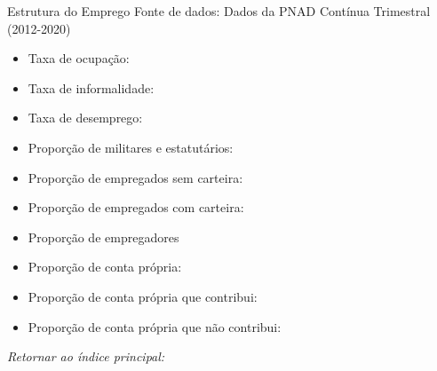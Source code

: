 \begin{frame}[label=_estrutura_emprego]{Estrutura do Emprego}
{\footnotesize Fonte de dados: Dados da PNAD Contínua Trimestral (2012-2020)}
\begin{itemize}
\item{Taxa de ocupação: \hyperlink{_estrutura_emprego_taxa_de_ocupacao}{}}
\item{Taxa de informalidade: \hyperlink{_estrutura_emprego_taxa_de_informalidade}{}}
\item{Taxa de desemprego: \hyperlink{_estrutura_emprego_taxa_de_desemprego}{}}
\item{Proporção de militares e estatutários: \hyperlink{_estrutura_emprego_prop_militar}{}}
\item{Proporção de empregados sem carteira: \hyperlink{_estrutura_emprego_prop_empregadoSC}{}}
\item{Proporção de empregados com carteira: \hyperlink{_estrutura_emprego_prop_empregadoCC}{}}
\item{Proporção de empregadores \hyperlink{_estrutura_emprego_prop_empregador}{}}
\item{Proporção de conta própria: \hyperlink{_estrutura_emprego_prop_cpropria}{}}
\item{Proporção de conta própria que contribui: \hyperlink{_estrutura_emprego_prop_cpropriaC}{}}
\item{Proporção de conta própria que não contribui: \hyperlink{_estrutura_emprego_prop_cpropriaNc}{}}
\end{itemize}

\begin{small}
\textit{Retornar ao índice principal: \hyperlink{indice_principal}{} }
\end{small}

\end{frame}

